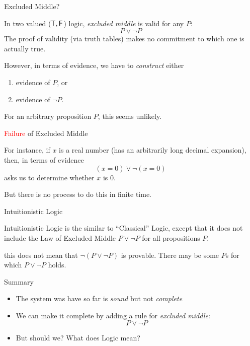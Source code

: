 \documentclass[xetex,aspectratio=169,14pt,hyperref={pdfpagelabels=true,pdflang={en-GB}}]{beamer}
\begin{document}
\begin{frame}
  {Excluded Middle?}

  In two valued ($\mathsf{T}, \mathsf{F}$) logic, \emph{excluded middle} is valid for any $P$:
  \begin{displaymath}
    P \lor \lnot P
  \end{displaymath}
  The proof of validity (via truth tables) makes no commitment to
  which one is actually true.

  \pause
  \bigskip

  However, in terms of evidence, we have to \emph{construct} either
  \begin{enumerate}
  \item evidence of $P$, or
  \item evidence of $\lnot P$.
  \end{enumerate}
  For an arbitrary proposition $P$, this seems unlikely.
\end{frame}

\begin{frame}
  {\textcolor{red}{Failure} of Excluded Middle}

  For instance, if $x$ is a real number (has an arbitrarily long
  decimal expansion), then, in terms of evidence
  \begin{displaymath}
    (x = 0) \lor \lnot (x = 0)
  \end{displaymath}
  asks us to determine whether $x$ is $0$.

  \medskip

  But there is no process to do this in finite time.\\
\end{frame}

\begin{frame}
  {Intuitionistic Logic}

  Intuitionistic Logic is the similar to ``Classical'' Logic, except
  that it does not include the Law of Excluded Middle $P \lor \lnot P$
  for all propositions $P$.

  \medskip

   this does not mean that $\lnot (P \lor \lnot P)$ is
  provable. There may be some $P$s for which $P \lor \lnot P$ holds.\\
\end{frame}

\begin{frame}
  {Summary}

  \begin{itemize}
  \item The system was have so far is \emph{sound} but not \emph{complete}
  \item We can make it complete by adding a rule for \emph{excluded middle}:
    \begin{displaymath}
      P \lor \lnot P
    \end{displaymath}
  \item But should we? What does Logic mean?
  \end{itemize}
\end{frame}
\end{document}
